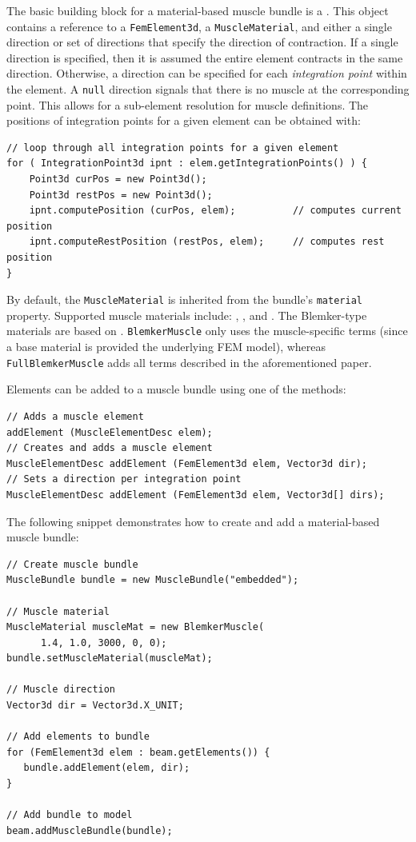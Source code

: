 The basic building block for a material-based muscle bundle is a 
.  This object contains
a reference to a {\tt FemElement3d}, a {\tt MuscleMaterial}, and either a
single direction or set of directions that specify the direction of 
contraction.  If a single direction is specified, then it is assumed the
entire element contracts in the same direction.  Otherwise, a direction
can be specified for each \emph{integration point} within the element.  A
{\tt null} direction signals that there is no muscle at the corresponding
point.  This allows for a sub-element resolution for muscle definitions. The 
positions of integration points for a given element can be obtained with:
\begin{lstlisting}[]
// loop through all integration points for a given element
for ( IntegrationPoint3d ipnt : elem.getIntegrationPoints() ) {
	Point3d curPos = new Point3d();
	Point3d restPos = new Point3d();
	ipnt.computePosition (curPos, elem);          // computes current position
	ipnt.computeRestPosition (restPos, elem);     // computes rest position
}
\end{lstlisting} 
By default, the {\tt MuscleMaterial} is inherited from the bundle's 
{\tt material} property.  Supported muscle materials include:
, 
, and 
.  The Blemker-type
materials are based on \cite{blemker:2005:muscle}.  {\tt BlemkerMuscle} only
uses the muscle-specific terms (since a base material is provided the 
underlying FEM model), whereas {\tt FullBlemkerMuscle} adds all terms described in 
the aforementioned paper.

Elements can be added to a muscle bundle using one of the methods:
\begin{lstlisting}[]
// Adds a muscle element
addElement (MuscleElementDesc elem);          
// Creates and adds a muscle element
MuscleElementDesc addElement (FemElement3d elem, Vector3d dir);     
// Sets a direction per integration point
MuscleElementDesc addElement (FemElement3d elem, Vector3d[] dirs);  
\end{lstlisting}

The following snippet demonstrates how to create and add a material-based
muscle bundle:
\lstset{numbers=left}
\begin{lstlisting}[]
// Create muscle bundle
MuscleBundle bundle = new MuscleBundle("embedded");

// Muscle material
MuscleMaterial muscleMat = new BlemkerMuscle(
      1.4, 1.0, 3000, 0, 0);
bundle.setMuscleMaterial(muscleMat); 

// Muscle direction
Vector3d dir = Vector3d.X_UNIT;

// Add elements to bundle
for (FemElement3d elem : beam.getElements()) {
   bundle.addElement(elem, dir);
}

// Add bundle to model      
beam.addMuscleBundle(bundle);
\end{lstlisting}
\lstset{numbers=none}

